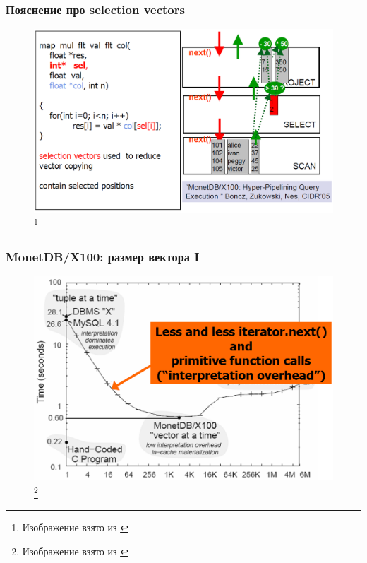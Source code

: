 \documentclass{beamer}
\begin{document}
\begin{frame}
\frametitle{Пояснение про selection vectors}

\begin{figure}[htb]
\includegraphics[width=\textwidth,height=0.750\textheight,keepaspectratio]{selectionvecs.png} 
\footnote{\tiny{Изображение взято из \cite{Harizopoulos2009}}}
\end{figure}

\end{frame}

\begin{frame}
\frametitle{MonetDB/X100: размер вектора I}

\begin{figure}[htb]
\includegraphics[width=\textwidth,height=0.750\textheight,keepaspectratio]{vecsize1.png} 
\footnote{\tiny{Изображение взято из \cite{Harizopoulos2009}}}
\end{figure}

\end{frame}
\end{document}
